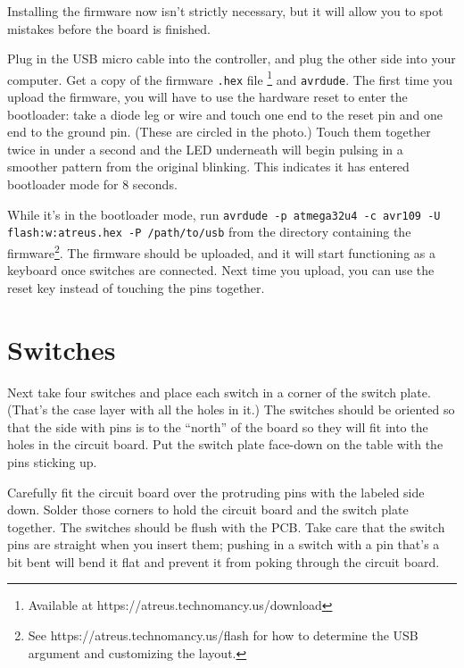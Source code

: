\documentclass[landscape,twocolumn]{article}
\begin{document}
Installing the firmware now isn't strictly necessary, but it will
allow you to spot mistakes before the board is finished.

\vspace{1em}

Plug in the USB micro cable into the controller, and plug the other
side into your computer. Get a copy of the
firmware \texttt{.hex} file \footnote{Available at
  https://atreus.technomancy.us/download} and \texttt{avrdude}. The
first time you upload the firmware, you will have to use the hardware
reset to enter the bootloader: take a diode leg or wire and touch one
end to the reset pin and one end to the ground pin. (These are circled
in the photo.)  Touch them together twice in under a second and the
LED underneath will begin pulsing in a smoother pattern from the
original blinking. This indicates it has entered bootloader mode for 8
seconds.

\vspace{1em}

While it's in the bootloader mode, run \texttt{avrdude -p atmega32u4
  -c avr109 -U flash:w:atreus.hex -P /path/to/usb} from the directory
containing the firmware\footnote{See
  https://atreus.technomancy.us/flash for how to determine the USB
  argument and customizing the layout.}. The firmware should be
uploaded, and it will start functioning as a keyboard once switches
are connected. Next time you upload, you can use the reset key instead
of touching the pins together.

\section{Switches}

Next take four switches and place each switch in a corner of the
switch plate. (That's the case layer with all the holes in it.) The
switches should be oriented so that the side with pins is to the
``north'' of the board so they will fit into the holes in the circuit
board. Put the switch plate face-down on the table with the pins
sticking up.

\vspace{1em}

Carefully fit the circuit board over the protruding pins with the
labeled side down. Solder those corners to hold the circuit board and
the switch plate together. The switches should be flush with the
PCB. Take care that the switch pins are straight when you insert them;
pushing in a switch with a pin that's a bit bent will bend it flat and
prevent it from poking through the circuit board.
\end{document}
